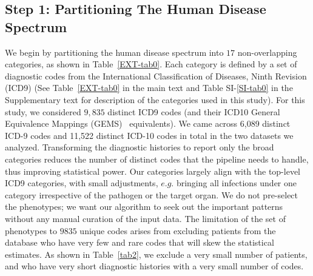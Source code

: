 \documentclass[3p,super,numbers,sort&compress,preprint,10pt]{elsarticle}
\begin{document}
\subsection*{Step 1: Partitioning The Human Disease Spectrum} We begin by partitioning the human disease spectrum into  $17$ non-overlapping  categories,  as shown in Table~\ref{EXT-tab0}. Each category is defined by a set of diagnostic codes from the International Classification of Diseases, Ninth Revision (ICD9) (See Table~\ref{EXT-tab0} in the main text  and Table SI-\ref{SI-tab0} in the Supplementary text for description of  the categories used in this study).
For this study, we considered $9,835$ distinct ICD9 codes (and their ICD10 General Equivalence Mappings (GEMS)~\cite{GEMS} equivalents). We came across 6,089 distinct ICD-9 codes and 11,522 distinct ICD-10 codes in total in the two datasets we analyzed. Transforming the diagnostic histories to report only the broad categories   reduces the number of distinct codes that the pipeline needs to handle, thus improving statistical  power.  %
% 
Our categories largely align with the top-level ICD9 categories, with small 
adjustments, $e.g.$ bringing all infections under one category irrespective of the pathogen or the target organ.
We do not pre-select the phenotypes; we want our algorithm to seek out the important patterns without any manual curation of the input data. The limitation of the set of phenotypes to $9835$ unique codes arises from excluding patients from the database who have very few and rare codes that will skew the statistical estimates. As shown in Table~\ref{tab2}, we exclude a very small number of patients, and who have  very short diagnostic histories with a very small number of codes.
\end{document}
